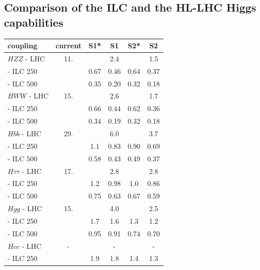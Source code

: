 \subsection{Comparison of the ILC and the HL-LHC Higgs capabilities}
\label{subsec:higgs:ilclhc}


\begin{table}[!htbp]
\begin{center}
\begin{tabular}{lccccc}
   coupling     &  current  &    S1*     &     S1     &    S2*   &   S2   \\ \hline 
$HZZ$ - LHC  &     11.      &        &       2.4  &        &  1.5 \\ 
\phantom{$HZZ$} - ILC 250 &      &   0.67  &  0.46   &   0.64   &  0.37 \\ 
\phantom{$HZZ$} - ILC 500&      &   0.35  &  0.20  &  0.32   & 0.18 \\ 
 \hline 
$HWW$ - LHC  &    15.       &        &    2.6    &        &  1.7 \\ 
\phantom{$HWW$} - ILC 250 &      &   0.66 &  0.44   &   0.62  &  0.36 \\ 
 \phantom{$HWW$} - ILC 500 &      &   0.34 &  0.19   &  0.32 & 0.18 \\ 
   \hline 
$Hbb$ - LHC  &    29.       &        &         6.0   &        & 3.7 \\ 
\phantom{$Hbb$} - ILC 250 &      &  1.1  & 0.83   &   0.90   &  0.69 \\ 
\phantom{$Hbb$} - ILC 500 &      &  0.58  & 0.43   &  0.49  &  0.37 \\ 
 \hline 
$H\tau\tau$ - LHC  &    17.       &        &             2.8  &        & 2.8 \\ 
\phantom{$H\tau\tau$} - ILC 250 &      &  1.2  &  0.98   &   1.0  &  0.86 \\ 
\phantom{$H\tau\tau$} - ILC 500 &      &  0.75  &  0.63   &  0.67   & 0.59 \\ 
    \hline 
$Hgg$ - LHC  &     15.      &        &            4.0   &        &
               2.5  \\ 
\phantom{$hgg$} - ILC 250 &      &  1.7  &  1.6   &   1.3   &  1.2 \\ 
 \phantom{$hgg$} - ILC 500 &      &  0.95  &  0.91   &  0.74  & 0.70 \\ 
\hline 
$Hcc$ - LHC  &    -       &        &           -  &        &  - \\ 
\phantom{$Hcc$} - ILC 250 &      &   1.9  &  1.8   &   1.4  &  1.3 \\ 

\end{tabular}
\end{center}
\end{table}
